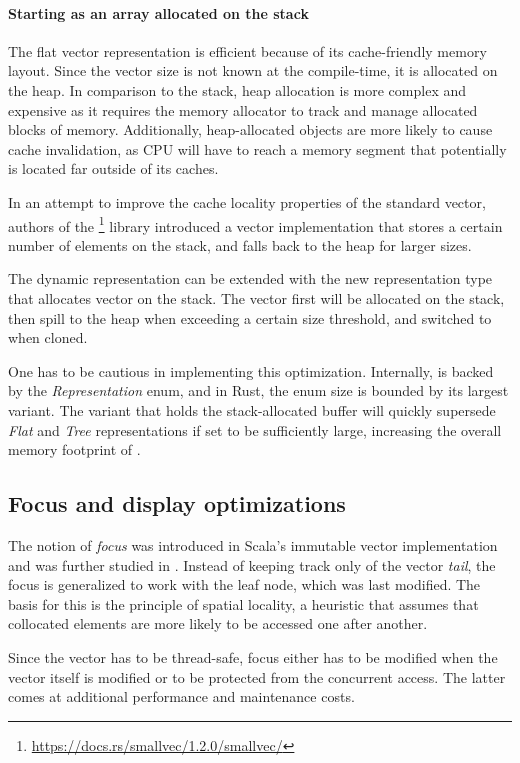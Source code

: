 \paragraph{Starting as an array allocated on the stack}
The flat vector representation is efficient because of its cache-friendly memory layout. Since the vector size is not known at the compile-time, it is allocated on the heap. In comparison to the stack, heap allocation is more complex and expensive as it requires the memory allocator to track and manage allocated blocks of memory. Additionally, heap-allocated objects are more likely to cause cache invalidation, as CPU will have to reach a memory segment that potentially is located far outside of its caches.

In an attempt to improve the cache locality properties of the standard vector, authors of the \footnote{\url{https://docs.rs/smallvec/1.2.0/smallvec/}} library introduced a vector implementation that stores a certain number of elements on the stack, and falls back to the heap for larger sizes.

The dynamic representation can be extended with the new representation type that allocates vector on the stack. The vector first will be allocated on the stack, then spill to the heap when exceeding a certain size threshold, and switched to \rrbvec{} when cloned.

One has to be cautious in implementing this optimization. Internally, \pvec{} is backed by the \emph{Representation} enum, and in Rust, the enum size is bounded by its largest variant. The variant that holds the stack-allocated buffer will quickly supersede \emph{Flat} and \emph{Tree} representations if set to be sufficiently large, increasing the overall memory footprint of \pvec{}.

\subsection{Focus and display optimizations}
The notion of \emph{focus} was introduced in Scala's immutable vector implementation and was further studied in \cite{rrb-vector-practical-general-purpose-im-sequence}. Instead of keeping track only of the vector \emph{tail}, the focus is generalized to work with the leaf node, which was last modified. The basis for this is the principle of spatial locality, a heuristic that assumes that collocated elements are more likely to be accessed one after another.

Since the vector has to be thread-safe, focus either has to be modified when the vector itself is modified or to be protected from the concurrent access. The latter comes at additional performance and maintenance costs.

